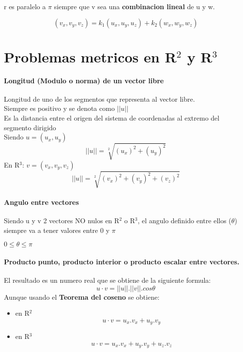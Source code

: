 \documentclass[11pt]{article}
\begin{document}
r es paralelo a $\pi$ siempre que v sea una \textbf{combinacion lineal} de u y w.

\begin{equation*}
	(v_x, v_y, v_z) = k_1 (u_x, u_y, u_z) + k_2 (w_x, w_y, w_z)
\end{equation*}
\section{Problemas metricos en R$^2$ y R$^3$}

\paragraph{Longitud (Modulo o norma) de un vector libre}
Longitud de uno de los segmentos que representa al vector libre.\\
Siempre es positivo y se denota como $|| u ||$\\
Es la distancia entre el origen del sistema de coordenadas al extremo del segmento dirigido\\
Siendo $u = (u_x, u_y)$
\begin{equation*}
	||u|| = \sqrt[2]{(u_x)^2+(u_y)^2}
\end{equation*}
En R$^3$:
$v = (v_x, v_y, v_z)$
\begin{equation*}
	||u|| = \sqrt[2]{(v_x)^2+(v_y)^2 + (v_z)^2}
\end{equation*}
\paragraph{Angulo entre vectores}
Siendo u y v 2 vectores NO nulos en R$^2$ o R$^3$, el angulo definido entre ellos ($\theta$) siempre va a tener valores entre 0 y $\pi$
\begin{center}
	$0 \leq \theta \leq \pi$
\end{center}
\paragraph{Producto punto, producto interior  o producto escalar entre vectores.}
El resultado es un numero real que se obtiene de la siguiente formula:
\begin{equation*}
	u \cdot v = ||u||.||v||.cos \theta
\end{equation*}
Aunque usando el \textbf{Teorema del coseno} se obtiene:
\begin{itemize}
	\item en R$^2$
	\begin{equation*}
		u \cdot v = u_x . v_x + u_y . v_y
	\end{equation*}
	\item en R$^3$
	\begin{equation*}
		u \cdot v = u_x . v_x + u_y . v_y + u_z . v_z
	\end{equation*}
\end{itemize}
\end{document}
